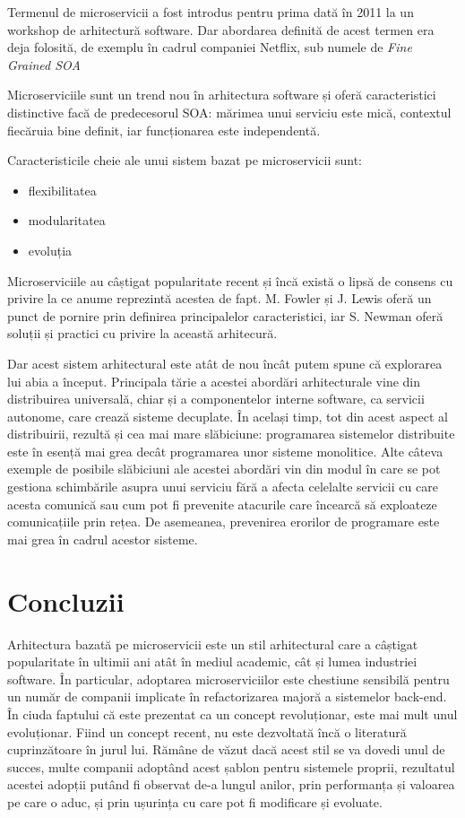 \documentclass[12pt, a4paper, twocolumn]{article} %
\begin{document}
Termenul de microservicii a fost introdus pentru prima dată în 2011 la un workshop de arhitectură software. Dar abordarea definită de acest termen era deja folosită, de exemplu în cadrul companiei Netflix, sub numele de \textit{Fine Grained SOA}\par
Microserviciile sunt un trend nou în arhitectura software și oferă caracteristici distinctive facă de predecesorul SOA: mărimea unui serviciu este mică, contextul fiecăruia bine definit, iar funcționarea este independentă.\par Caracteristicile cheie ale unui sistem bazat pe microservicii sunt:
\begin{itemize}
  \item flexibilitatea
  \item modularitatea
  \item evoluția
\end{itemize}\par
Microserviciile au câștigat popularitate recent și încă există o lipsă de consens cu privire la ce anume reprezintă acestea de fapt. M. Fowler și J. Lewis oferă un punct de pornire prin definirea principalelor caracteristici, iar S. Newman oferă soluții și practici cu privire la această arhitecură.\citep{newman2015building}\par
Dar acest sistem arhitectural este atât de nou încât putem spune că explorarea lui abia a început. Principala tărie a acestei abordări arhitecturale vine din distribuirea universală, chiar și a componentelor interne software, ca servicii autonome, care crează sisteme decuplate. În același timp, tot din acest aspect al distribuirii, rezultă și cea mai mare slăbiciune: programarea sistemelor distribuite este în esență mai grea decât programarea unor sisteme monolitice. Alte câteva exemple de posibile slăbiciuni ale acestei abordări vin din modul în care se pot gestiona schimbările asupra unui serviciu fără a afecta celelalte servicii cu care acesta comunică sau cum pot fi prevenite atacurile care încearcă să exploateze comunicațiile prin rețea. De asemeanea, prevenirea erorilor de programare este mai grea în cadrul acestor sisteme.

\clearpage

\section{Concluzii}
Arhitectura bazată pe microservicii este un stil arhitectural care a câștigat popularitate în ultimii ani atât în mediul academic, cât și lumea industriei software. În particular, adoptarea microserviciilor este chestiune sensibilă pentru un număr de companii implicate în refactorizarea majoră a sistemelor back-end. În ciuda faptului că este prezentat ca un concept revoluționar, este mai mult unul evoluționar. Fiind un concept recent, nu este dezvoltată încă o literatură cuprinzătoare în jurul lui. Rămâne de văzut dacă acest stil se va dovedi unul de succes, multe companii adoptând acest șablon pentru sistemele proprii, rezultatul acestei adopții putând fi observat de-a lungul anilor, prin performanța și valoarea pe care o aduc, și prin ușurința cu care pot fi modificare și evoluate.
\end{document}
